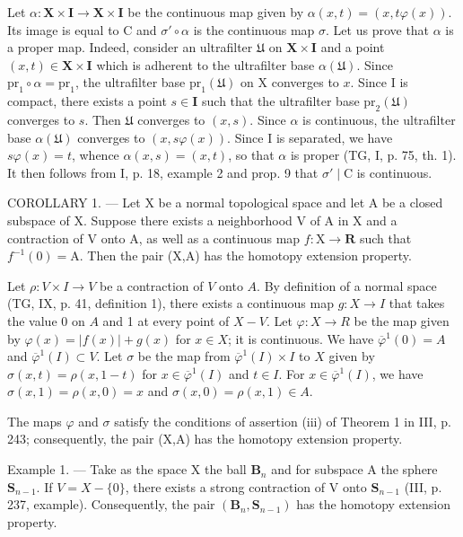 Let \(\alpha\colon\mathbf{X}\times\mathbf{I}\to\mathbf{X}\times\mathbf{I}\) be the continuous map given by \(\alpha(x,t)=(x,t\varphi(x))\). Its image is equal to C and \(\sigma'\circ\alpha\) is the continuous map \(\sigma\). Let us prove that \(\alpha\) is a proper map. Indeed, consider an ultrafilter \(\mathfrak{U}\) on \(\mathbf{X}\times\mathbf{I}\) and a point \((x,t)\in\mathbf{X}\times\mathbf{I}\) which is adherent to the ultrafilter base \(\alpha(\mathfrak{U})\). Since \(\mathrm{pr}_{1}\circ\alpha=\mathrm{pr}_{1}\), the ultrafilter base \(\mathrm{pr}_{1}(\mathfrak{U})\) on X converges to \(x\). Since I is compact, there exists a point \(s\in\mathbf{I}\) such that the ultrafilter base \(\mathrm{pr}_{2}(\mathfrak{U})\) converges to \(s\). Then \(\mathfrak{U}\) converges to \((x,s)\). Since \(\alpha\) is continuous, the ultrafilter base \(\alpha(\mathfrak{U})\) converges to \((x,s\varphi(x))\). Since I is separated, we have \(s\varphi(x)=t\), whence \(\alpha(x,s)=(x,t)\), so that \(\alpha\) is proper (TG, I, p. 75, th. 1). It then follows from I, p. 18, example 2 and prop. 9 that \(\sigma'\mid\mathrm{C}\) is continuous.

COROLLARY 1. --- Let X be a normal topological space and let A be a closed subspace of X. Suppose there exists a neighborhood V of A in X and a contraction of V onto A, as well as a continuous map \(f: \mathrm{X} \to \mathbf{R}\) such that \(f^{-1}(0) = \mathrm{A}\). Then the pair (X,A) has the homotopy extension property.

Let \(\rho\colon V \times I \to V\) be a contraction of \(V\) onto \(A\). By definition of a normal space (TG, IX, p. 41, definition 1), there exists a continuous map \(g\colon X \to I\) that takes the value 0 on \(A\) and 1 at every point of \(X - V\). Let \(\varphi\colon X \to R\) be the map given by \(\varphi(x) = |f(x)| + g(x)\) for \(x \in X\); it is continuous. We have \(\overline{\varphi}^{1}(0) = A\) and \(\overline{\varphi}^{1}(I) \subset V\). Let \(\sigma\) be the map from \(\overline{\varphi}^{1}(I) \times I\) to \(X\) given by \(\sigma(x,t) = \rho(x,1-t)\) for \(x \in \overline{\varphi}^{1}(I)\) and \(t \in I\). For \(x \in \overline{\varphi}^{1}(I)\), we have \(\sigma(x,1) = \rho(x,0) = x\) and \(\sigma(x,0) = \rho(x,1) \in A\).

The maps \(\varphi\) and \(\sigma\) satisfy the conditions of assertion (iii) of Theorem 1 in III, p. 243; consequently, the pair (X,A) has the homotopy extension property.

Example 1. --- Take as the space X the ball \(\mathbf{B}_{n}\) and for subspace A the sphere \(\mathbf{S}_{n-1}\). If \(V = X - \{0\}\), there exists a strong contraction of V onto \(\mathbf{S}_{n-1}\) (III, p. 237, example). Consequently, the pair \((\mathbf{B}_{n}, \mathbf{S}_{n-1})\) has the homotopy extension property.

